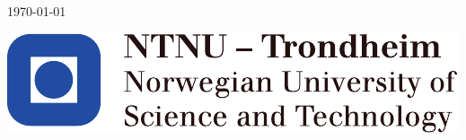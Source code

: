 \begin{titlepage}
\vfill

{\large \today}\\[2cm] %

\vfill

\includegraphics[scale=1.1]{fig/NTNU}


\end{titlepage}
